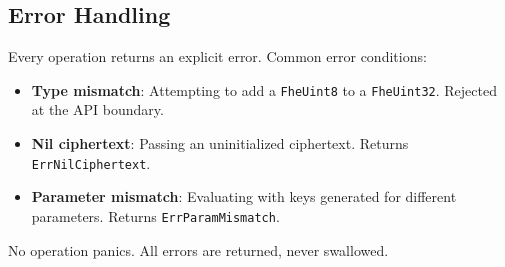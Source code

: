 \subsection{Error Handling}

Every operation returns an explicit error. Common error conditions:

\begin{itemize}
\item \textbf{Type mismatch}: Attempting to add a \texttt{FheUint8} to a \texttt{FheUint32}. Rejected at the API boundary.
\item \textbf{Nil ciphertext}: Passing an uninitialized ciphertext. Returns \texttt{ErrNilCiphertext}.
\item \textbf{Parameter mismatch}: Evaluating with keys generated for different parameters. Returns \texttt{ErrParamMismatch}.
\end{itemize}

No operation panics. All errors are returned, never swallowed.

